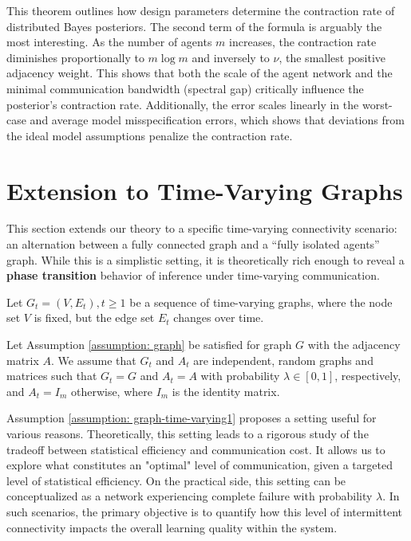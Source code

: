 \documentclass[twoside,11pt]{article}
\numberwithin{equation}{section}
\begin{document}
{This theorem outlines how design parameters determine the contraction rate of distributed Bayes posteriors. The second term of the formula is arguably the most interesting. As the number of agents $m$ increases, the contraction rate diminishes proportionally to $m \log m$ and inversely to $\nu$, the smallest positive adjacency weight. This shows that both the scale of the agent network and the minimal communication bandwidth (spectral gap) critically influence the posterior's contraction rate. Additionally, the error scales linearly in the worst-case and average model misspecification errors, which shows that deviations from the ideal model assumptions penalize the contraction rate. 

\section{Extension to Time-Varying Graphs} \label{sect:time-varying-graphs}
This section extends our theory to a specific time-varying connectivity scenario: an alternation between a fully connected graph and a “fully isolated agents” graph. While this is a simplistic setting, it is theoretically rich enough to reveal a \textbf{phase transition} behavior of inference under time-varying communication.

Let $G_t = (V, E_t), t \geq 1$ be a sequence of time-varying graphs, where the node set $V$ is fixed, but the edge set $E_t$ changes over time.
\begin{assumption}
\label{assumption: graph-time-varying1}
Let Assumption \ref{assumption: graph} be satisfied for graph $G$ with the adjacency matrix $A$. We assume that $G_t$ and $A_t$ are independent, random graphs and matrices such that $G_t = G$ and $A_t = A$ with probability $\lambda \in [0, 1]$, respectively, and $A_t = I_m$ otherwise, where $I_m$ is the identity matrix.
\end{assumption}

Assumption \ref{assumption: graph-time-varying1} proposes a setting useful for various reasons. Theoretically, this setting leads to a rigorous study of the tradeoff between statistical efficiency and communication cost. It allows us to explore what constitutes an "optimal" level of communication, given a targeted level of statistical efficiency. On the practical side, this setting can be conceptualized as a network experiencing complete failure with probability $\lambda$. In such scenarios, the primary objective is to quantify how this level of intermittent connectivity impacts the overall learning quality within the system.  

}
\end{document}
